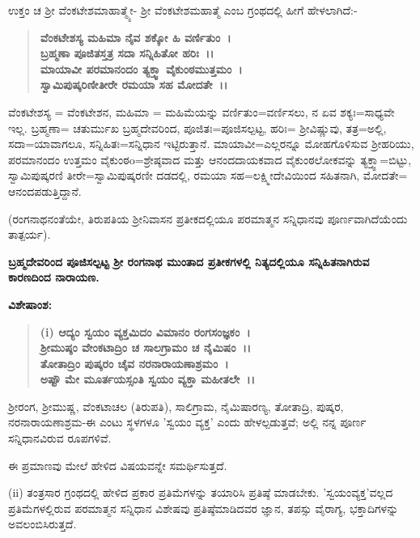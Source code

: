ಉಕ್ತಂ ಚ ಶ‍್ರೀ ವೆಂಕಟೇಶಮಾಹಾತ್ಮ್ಯೇ- ಶ‍್ರೀ ವೆಂಕಟೇಶಮಹಾತ್ಮೆ ಎಂಬ ಗ್ರಂಥದಲ್ಲಿ ಹೀಗೆ ಹೇಳಲಾಗಿದೆ:-

\begin{verse}
\textbf{ವೆಂಕಟೇಶಸ್ಯ ಮಹಿಮಾ ನೈವ ಶಕ್ಕೋ ಹಿ ವರ್ಣಿತುಂ~।}\\\textbf{ಬ್ರಹ್ಮಣಾ ಪೂಜಿತಸ್ತತ್ರ ಸದಾ ಸನ್ನಿಹಿತೋ ಹರಿಃ~।।}\\\textbf{ಮಾಯಾವೀ ಪರಮಾನಂದಂ ತ್ಯಕ್ತ್ವಾ ವೈಕುಂಠಮುತ್ತಮಂ~।}\\\textbf{ಸ್ವಾಮಿಪುಷ್ಕರಿಣೀತೀರೇ ರಮಯಾ ಸಹ ಮೋದತೇ~।।}
\end{verse}

ವೆಂಕಟೇಶಸ್ಯ = ವೆಂಕಟೇಶನ, ಮಹಿಮಾ = ಮಹಿಮೆಯನ್ನು ವರ್ಣಿತುಂ=ವರ್ಣಿಸಲು, ನ ಏವ ಶಕ್ಯಃ=ಸಾಧ್ಯವೇ ಇಲ್ಲ. ಬ್ರಹ್ಮಣಾ= ಚತುರ್ಮುಖ ಬ್ರಹ್ಮದೇವರಿಂದ, ಪೂಜಿತಃ\break =ಪೂಜಿಸಲ್ಪಟ್ಟ, ಹರಿಃ= ಶ‍್ರೀವಿಷ್ಣುವು, ತತ್ರ=ಅಲ್ಲಿ, ಸದಾ=ಯಾವಾಗಲೂ, ಸನ್ನಿಹಿತಃ=\break ಸನ್ನಿಧಾನ ಇಟ್ಟಿರುತ್ತಾನೆ. ಮಾಯಾವೀ=ಎಲ್ಲರನ್ನೂ ಮೋಹಗೊಳಿಸುವ ಶ‍್ರೀಹರಿಯು, ಪರಮಾನಂದಂ ಉತ್ತಮಂ ವೈಕುಂಠo=ಶ್ರೇಷ್ಠವಾದ ಮತ್ತು ಆನಂದದಾಯಕವಾದ ವೈಕುಂಠಲೋಕವನ್ನು ತ್ಯಕ್ತ್ವಾ=ಬಿಟ್ಟು, ಸ್ವಾಮಿಪುಷ್ಕರಣಿ ತೀರೇ=ಸ್ವಾಮಿಪುಷ್ಕರಣೀ ದಡದಲ್ಲಿ, ರಮಯಾ ಸಹ=ಲಕ್ಷ್ಮೀದೇವಿಯಿಂದ ಸಹಿತನಾಗಿ, ಮೋದತೇ= ಆನಂದಪಡುತ್ತಿದ್ದಾನೆ.

(ರಂಗನಾಥನಂತೆಯೇ, ತಿರುಪತಿಯ ಶ‍್ರೀನಿವಾಸನ ಪ್ರತೀಕದಲ್ಲಿಯೂ ಪರಮಾತ್ಮನ ಸನ್ನಿಧಾನವು ಪೂರ್ಣವಾಗಿದೆಯೆಂದು ತಾತ್ಪರ್ಯ).

\begin{center}
\textbf{ಬ್ರಹ್ಮದೇವರಿಂದ ಪೂಜಿಸಲ್ಪಟ್ಟ ಶ‍್ರೀ ರಂಗನಾಥ ಮುಂತಾದ ಪ್ರತೀಕಗಳಲ್ಲಿ ನಿತ್ಯದಲ್ಲಿಯೂ ಸನ್ನಿಹಿತನಾಗಿರುವ ಕಾರಣದಿಂದ ನಾರಾಯಣ.}
\end{center}

\noindent
\textbf{ವಿಶೇಷಾಂಶ:\enginline{-}}

\begin{verse}
\textbf{(i) ಆದ್ಯಂ ಸ್ವಯಂ ವ್ಯಕ್ತಮಿದಂ ವಿಮಾನಂ ರಂಗಸಂಜ್ಞಕಂ~।}\\\textbf{ಶ‍್ರೀಮುಷ್ಠಂ ವೇಂಕಟಾದ್ರಿಂ ಚ ಸಾಲಗ್ರಾಮಂ ಚ ನೈಮಿಷಂ~।।}\\\textbf{ತೋತಾದ್ರಿಂ ಪುಷ್ಕರಂ ಚೈವ ನರನಾರಾಯಣಾಶ್ರಮಂ~।}\\\textbf{ಅಷ್ಟೌ ಮೇ ಮೂರ್ತಯಸ್ಸಂತಿ ಸ್ವಯಂ ವ್ಯಕ್ತಾ ಮಹೀತಲೇ~।।}
\end{verse}

ಶ‍್ರೀರಂಗ, ಶ‍್ರೀಮುಷ್ಣ, ವೆಂಕಟಾಚಲ (ತಿರುಪತಿ), ಸಾಲಿಗ್ರಾಮ, ನೈಮಿಷಾರಣ್ಯ, ತೋತಾದ್ರಿ, ಪುಷ್ಕರ, ನರನಾರಾಯಣಾಶ್ರಮ-ಈ ಎಂಟು ಸ್ಥಳಗಳೂ 'ಸ್ವಯಂ ವ್ಯಕ್ತ' ಎಂದು ಹೇಳಲ್ಪಡುತ್ತವೆ; ಅಲ್ಲಿ ನನ್ನ ಪೂರ್ಣ ಸನ್ನಿಧಾನವಿರುವ ರೂಪಗಳಿವೆ.

ಈ ಪ್ರಮಾಣವು ಮೇಲೆ ಹೇಳಿದ ವಿಷಯವನ್ನೇ ಸಮರ್ಥಿಸುತ್ತದೆ.

(ii) ತಂತ್ರಸಾರ ಗ್ರಂಥದಲ್ಲಿ ಹೇಳಿದ ಪ್ರಕಾರ ಪ್ರತಿಮೆಗಳನ್ನು ತಯಾರಿಸಿ ಪ್ರತಿಷ್ಠೆ ಮಾಡಬೇಕು. 'ಸ್ವಯಂವ್ಯಕ್ತ'ವಲ್ಲದ ಪ್ರತಿಮೆಗಳಲ್ಲಿರುವ ಪರಮಾತ್ಮನ ಸನ್ನಿಧಾನ ವಿಶೇಷವು ಪ್ರತಿಷ್ಠೆಮಾಡಿದವರ ಜ್ಞಾನ, ತಪಸ್ಸು ವೈರಾಗ್ಯ, ಭಕ್ತಾದಿಗಳನ್ನು ಅವಲಂಬಿಸಿರುತ್ತದೆ.

